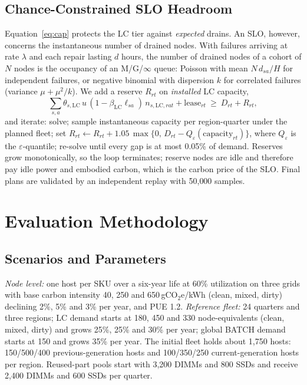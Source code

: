 \documentclass[11pt]{article}
\begin{document}
\subsection{Chance-Constrained SLO Headroom}
Equation~\eqref{eq:cap} protects the LC tier against \emph{expected} drains. An SLO, however, concerns the instantaneous number of drained nodes. With failures arriving at rate $\lambda$ and each repair lasting $d$ hours, the number of drained nodes of a cohort of $N$ nodes is the occupancy of an M/G/$\infty$ queue: Poisson with mean $N\,d_{sa}/H$ for independent failures, or negative binomial with dispersion $k$ for correlated failures (variance $\mu+\mu^2/k$). We add a reserve $R_{rt}$ on \emph{installed} LC capacity,
\begin{equation}
\sum_{s,a}\theta_{s,\text{LC}}\,u\,(1-\beta_{\text{LC}}\ell_{sa})\,n_{s,\text{LC},rat}+\text{lease}_{rt}\ \ge\ D_{rt}+R_{rt},
\label{eq:reserve}
\end{equation}
and iterate: solve; sample instantaneous capacity per region-quarter under the planned fleet; set $R_{rt}\leftarrow R_{rt}+1.05\,\max\{0,\,D_{rt}-Q_\varepsilon(\text{capacity}_{rt})\}$, where $Q_\varepsilon$ is the $\varepsilon$-quantile; re-solve until every gap is at most 0.05\% of demand. Reserves grow monotonically, so the loop terminates; reserve nodes are idle and therefore pay idle power and embodied carbon, which is the carbon price of the SLO. Final plans are validated by an independent replay with 50{,}000 samples.

\section{Evaluation Methodology}
\label{sec:method}
\subsection{Scenarios and Parameters}
\emph{Node level:} one host per SKU over a six-year life at 60\% utilization on three grids with base carbon intensity 40, 250 and 650\,gCO$_2$e/kWh (clean, mixed, dirty) declining 2\%, 5\% and 3\% per year, and PUE 1.2. \emph{Reference fleet:} 24 quarters and three regions; LC demand starts at 180, 450 and 330 node-equivalents (clean, mixed, dirty) and grows 25\%, 25\% and 30\% per year; global BATCH demand starts at 150 and grows 35\% per year. The initial fleet holds about 1{,}750 hosts: 150/500/400 previous-generation hosts and 100/350/250 current-generation hosts per region. Reused-part pools start with 3{,}200 DIMMs and 800 SSDs and receive 2{,}400 DIMMs and 600 SSDs per quarter.
\end{document}
